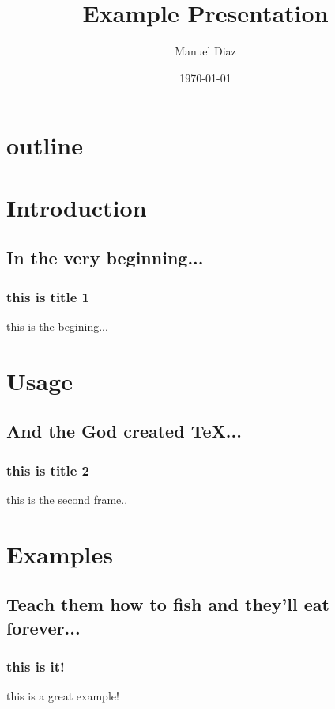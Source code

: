 \documentclass[11pt,fleqn]{beamer}
\title{Example Presentation}
\author{Manuel Diaz}
\date{\today}
\begin{document}
\begin{frame}
	\titlepage
\end{frame}

\section*{outline}
\begin{frame}
	\tableofcontents
\end{frame}

\section{Introduction}
\subsection{In the very beginning...}
\begin{frame}
	\frametitle{this is title 1}
	this is the begining...
\end{frame}

\section{Usage}
\subsection{And the God created TeX...}
\begin{frame}
	\frametitle{this is title 2}
	this is the second frame..
\end{frame}

\section{Examples}
\subsection{Teach them how to fish and they'll eat forever...}
\begin{frame}
	\frametitle{this is it!}
	this is a great example!
\end{frame}
\end{document}
